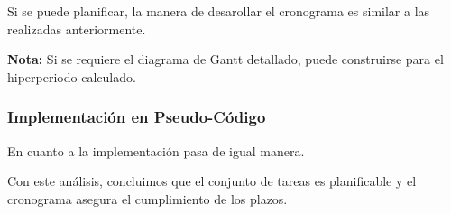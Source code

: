 \documentclass[a4paper,12pt]{article}
\begin{document}
Si se puede planificar, la manera de desarollar el cronograma es similar a las realizadas anteriormente.

\textbf{Nota:} Si se requiere el diagrama de Gantt detallado, puede construirse para el hiperperiodo calculado.

\subsubsection{Implementación en Pseudo-Código}



En cuanto a la implementación pasa de igual manera.

Con este análisis, concluimos que el conjunto de tareas es planificable y el cronograma asegura el cumplimiento de los plazos.












\end{document}
